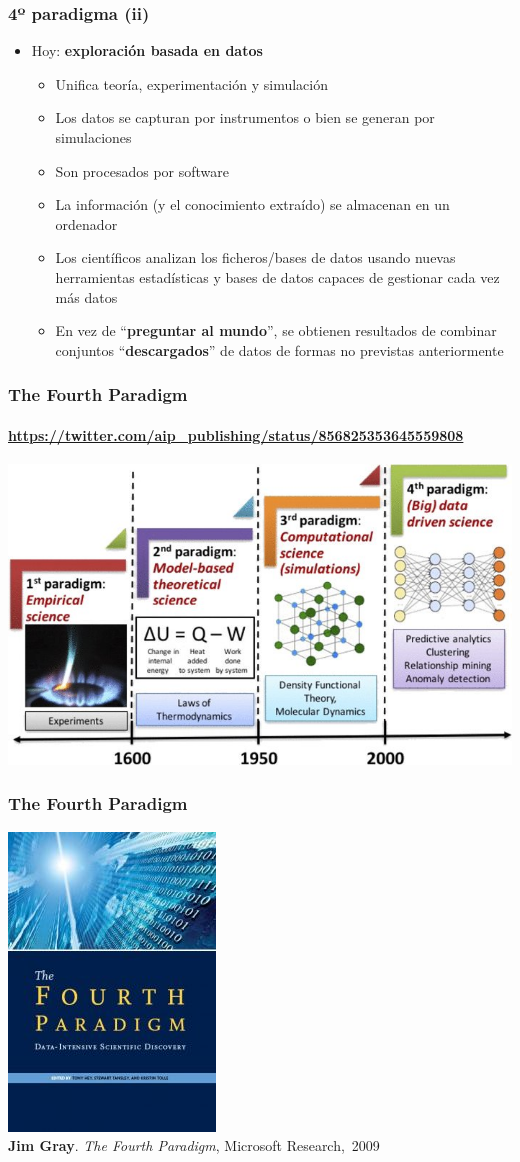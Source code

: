 \documentclass[14pt]{beamer}
\begin{document}
\begin{frame}
  \frametitle{4º paradigma (ii)}
\vspace*{-.5em}
  \begin{itemize}
  \item Hoy: {\bf exploración basada en datos}
\begin{itemize}
\item Unifica teoría, experimentación y simulación
\item Los datos se capturan por instrumentos o bien se generan por
  simulaciones
\item Son procesados por software
  \item La información (y el conocimiento extraído) se almacenan en un
    ordenador
    \item Los científicos analizan los ficheros/bases de datos usando
     nuevas herramientas estadísticas y bases de datos capaces de
     gestionar cada vez más datos
   \item En vez de ``{\bf preguntar al mundo}'', se obtienen resultados de
     combinar conjuntos ``{\bf descargados}'' de datos de formas no
     previstas anteriormente
    \end{itemize}
\end{itemize}
\end{frame}

\begin{frame}
  \frametitle{The Fourth Paradigm}
  \framesubtitle{\url{https://twitter.com/aip_publishing/status/856825353645559808}}

  \includegraphics[width=\textwidth]{img/fourth-paradigm2}
\end{frame}

\begin{frame}
  \frametitle{The Fourth Paradigm}
  \includegraphics[height=12ex]{img/fourth-paradigm}\\ {\bf Jim Gray}. {\em
    The Fourth Paradigm}, Microsoft Research,~2009
\end{frame}
\end{document}

